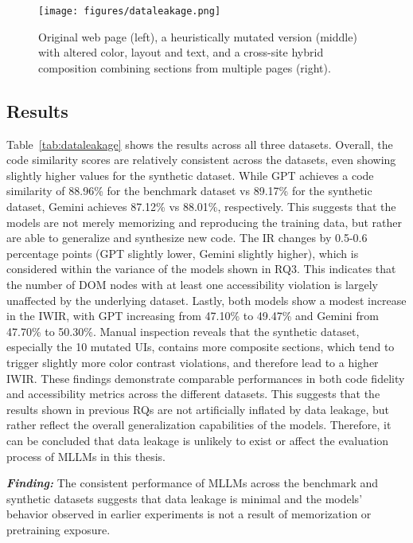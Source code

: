 \begin{figure}
  \centering
  \texttt{[image: figures/dataleakage.png]}
  \caption{Original web page (left), a heuristically mutated version (middle) with altered color, layout and text, and a cross-site hybrid composition combining sections from multiple pages (right).}
  \label{fig:dataleakagemutation} 
\end{figure}

\begingroup
    
\endgroup

\subsection{Results}
Table~\ref{tab:dataleakage} shows the results across all 
three datasets. Overall, the code similarity scores are 
relatively consistent across the datasets, even showing slightly 
higher values for the synthetic dataset. While GPT 
achieves a code similarity of 88.96\% for the benchmark dataset vs 
89.17\% for the synthetic dataset, Gemini
achieves 87.12\% vs 88.01\%, respectively. This 
suggests that the models are not merely memorizing and 
reproducing the training data, but rather are 
able to generalize and synthesize new code. The 
IR changes by 0.5-0.6 percentage points (GPT 
slightly lower, Gemini slightly higher), which is 
considered within the variance of the models 
shown in RQ3. This indicates that the number of 
DOM nodes with at least one accessibility violation 
is largely unaffected by the underlying dataset.
Lastly, both models show a modest increase in the 
IWIR, with GPT increasing from 47.10\% to 49.47\% 
and Gemini from 47.70\% to 50.30\%. Manual inspection 
reveals that the synthetic dataset, especially 
the 10 mutated UIs, contains more composite sections, 
which tend to trigger slightly more color 
contrast violations, and therefore lead 
to a higher IWIR.\newline
These findings demonstrate comparable performances 
in both code fidelity and accessibility metrics across
the different datasets. This suggests that the results 
shown in previous RQs are not artificially inflated 
by data leakage, but rather reflect the overall 
generalization capabilities of the models. Therefore,
it can be concluded that data leakage is unlikely to 
exist or affect the evaluation process of MLLMs in 
this thesis.

\begin{center}
\begin{tcolorbox}[colback=black!5!white,colframe=black!75!black,bottom=-0.05pt,top=-0.05pt]
\textit{\textbf{Finding:}} The consistent performance of 
MLLMs across the benchmark and synthetic datasets 
suggests that data leakage is minimal 
and the models' behavior observed in earlier 
experiments is not a result of memorization 
or pretraining exposure.
\end{tcolorbox}
\end{center}